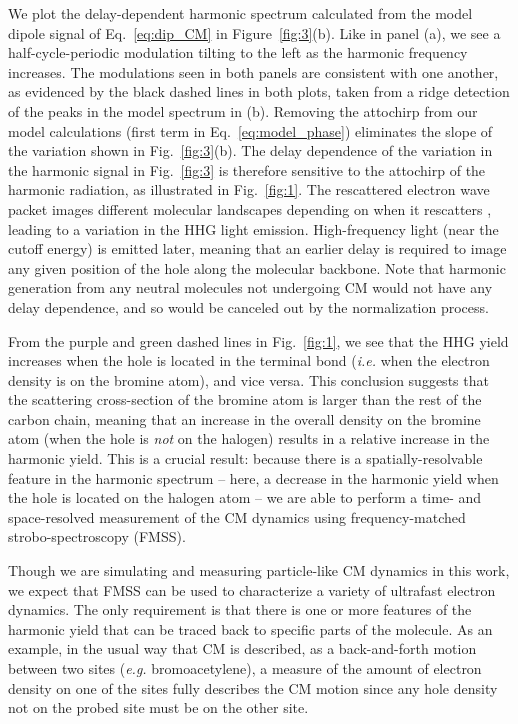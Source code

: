 \documentclass[journal=jacsat,manuscript=article]{achemso}
\begin{document}
We plot the delay-dependent harmonic spectrum calculated from the model dipole signal of Eq.~{\ref{eq:dip_CM}} in Figure~{\ref{fig:3}}(b). Like in panel (a), we see a half-cycle-periodic modulation tilting to the left as the harmonic frequency increases. The modulations seen in both panels are consistent with one another, as evidenced by the black dashed lines in both plots, taken from a ridge detection of the peaks in the model spectrum in (b). Removing the attochirp from our model calculations (first term in Eq.~{\ref{eq:model_phase}}) eliminates the slope of the variation shown in Fig.~{\ref{fig:3}}(b). The delay dependence of the variation in the harmonic signal in Fig.~{\ref{fig:3}} is therefore sensitive to the attochirp of the harmonic radiation, as illustrated in Fig.~{\ref{fig:1}}. The rescattered electron wave packet images different molecular landscapes depending on when it rescatters \cite{varju2005, niikura2005, smirnova2009, dudovich2006, azoury2017}, leading to a variation in the HHG light emission. High-frequency light (near the cutoff energy) is emitted later, meaning that an earlier delay is required to image any given position of the hole along the molecular backbone. Note that harmonic generation from any neutral molecules not undergoing CM would not have any delay dependence, and so would be canceled out by the normalization process. 

From the purple and green dashed lines in Fig.~{\ref{fig:1}}, we see that the HHG yield increases when the hole is located in the terminal bond (\emph{i.e.} when the electron density is on the bromine atom), and vice versa. This conclusion suggests that the scattering cross-section of the bromine atom is larger than the rest of the carbon chain, meaning that an increase in the overall density on the bromine atom (when the hole is \emph{not} on the halogen) results in a relative increase in the harmonic yield. This is a crucial result: because there is a spatially-resolvable feature in the harmonic spectrum -- here, a decrease in the harmonic yield when the hole is located on the halogen atom -- we are able to perform a time- and space-resolved measurement of the CM dynamics using frequency-matched strobo-spectroscopy (FMSS).

Though we are simulating and measuring particle-like CM dynamics \cite{folorunso2021, hamer2022} in this work, we expect that FMSS can be used to characterize a variety of ultrafast electron dynamics. The only requirement is that there is one or more features of the harmonic yield that can be traced back to specific parts of the molecule. As an example, in the usual way that CM is described, as a back-and-forth motion between two sites (\emph{e.g.} bromoacetylene), a measure of the amount of electron density on one of the sites fully describes the CM motion since any hole density not on the probed site must be on the other site. 
\end{document}
